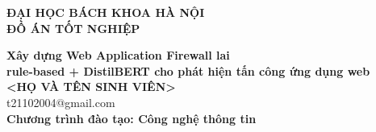 \documentclass[DoAn.tex]{subfiles}
\begin{document}
\begin{titlepage}
\thispagestyle{empty}
\begin{center}

{\textbf{\large{ĐẠI HỌC BÁCH KHOA HÀ NỘI}}}\\[4cm]

{\textbf{\huge{ ĐỒ ÁN TỐT NGHIỆP}}}\\[1cm]
{\textbf{\Large{Xây dựng Web Application Firewall lai\\rule-based + DistilBERT cho phát hiện tấn công ứng dụng web}}\\[1cm]

{\textbf{\large{<HỌ VÀ TÊN SINH VIÊN>}}}\\
{\large{t21102004@gmail.com}}\\[0.5cm]

{\textbf{\large{Chương trình đào tạo: Công nghệ thông tin
}}}\\

\vspace{4cm}
\begin{table}[H]
\centering
{}
\end{table}}
\end{center}



\end{titlepage}
\end{document}
